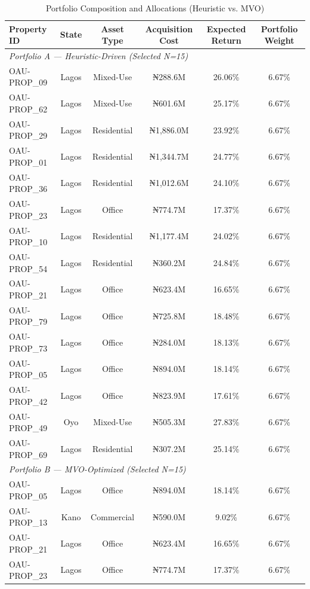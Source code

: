 \begin{table}[htbp]
\centering
\caption{Portfolio Composition and Allocations (Heuristic vs. MVO)}
\label{tab:portfolio_composition}
\begin{tabular}{lccccc}
\hline
\textbf{Property ID} & \textbf{State} & \textbf{Asset Type} & \textbf{Acquisition Cost} & \textbf{Expected Return} & \textbf{Portfolio Weight} \\
\hline
\multicolumn{6}{l}{\textit{Portfolio A — Heuristic-Driven (Selected N=15)}} \\
OAU-PROP_09 & Lagos & Mixed-Use & ₦288.6M & 26.06\% & 6.67\% \\
OAU-PROP_62 & Lagos & Mixed-Use & ₦601.6M & 25.17\% & 6.67\% \\
OAU-PROP_29 & Lagos & Residential & ₦1,886.0M & 23.92\% & 6.67\% \\
OAU-PROP_01 & Lagos & Residential & ₦1,344.7M & 24.77\% & 6.67\% \\
OAU-PROP_36 & Lagos & Residential & ₦1,012.6M & 24.10\% & 6.67\% \\
OAU-PROP_23 & Lagos & Office & ₦774.7M & 17.37\% & 6.67\% \\
OAU-PROP_10 & Lagos & Residential & ₦1,177.4M & 24.02\% & 6.67\% \\
OAU-PROP_54 & Lagos & Residential & ₦360.2M & 24.84\% & 6.67\% \\
OAU-PROP_21 & Lagos & Office & ₦623.4M & 16.65\% & 6.67\% \\
OAU-PROP_79 & Lagos & Office & ₦725.8M & 18.48\% & 6.67\% \\
OAU-PROP_73 & Lagos & Office & ₦284.0M & 18.13\% & 6.67\% \\
OAU-PROP_05 & Lagos & Office & ₦894.0M & 18.14\% & 6.67\% \\
OAU-PROP_42 & Lagos & Office & ₦823.9M & 17.61\% & 6.67\% \\
OAU-PROP_49 & Oyo & Mixed-Use & ₦505.3M & 27.83\% & 6.67\% \\
OAU-PROP_69 & Lagos & Residential & ₦307.2M & 25.14\% & 6.67\% \\
\hline
\multicolumn{6}{l}{\textit{Portfolio B — MVO-Optimized (Selected N=15)}} \\
OAU-PROP_05 & Lagos & Office & ₦894.0M & 18.14\% & 6.67\% \\
OAU-PROP_13 & Kano & Commercial & ₦590.0M & 9.02\% & 6.67\% \\
OAU-PROP_21 & Lagos & Office & ₦623.4M & 16.65\% & 6.67\% \\
OAU-PROP_23 & Lagos & Office & ₦774.7M & 17.37\% & 6.67\% \\

\end{tabular}
\end{table}
